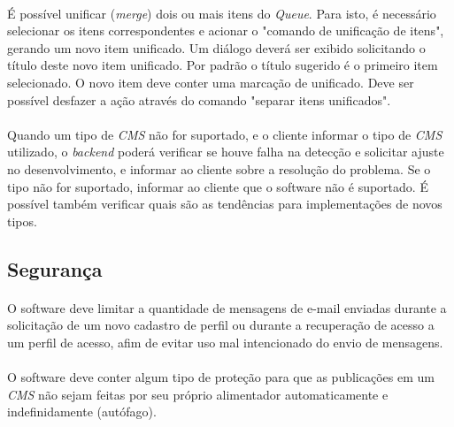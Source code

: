 \documentclass[a4paper,12pt]{article}
\def\cms{\emph{CMS}}
\def\queue{\emph{Queue}}
\begin{document}
\paragraph{}
É possível unificar (\emph{merge}) dois ou mais itens do \queue{}. Para isto, é
necessário selecionar os itens correspondentes e acionar o "comando de
unificação de itens", gerando um novo item unificado. Um diálogo deverá ser
exibido solicitando o título deste novo item unificado. Por padrão o título
sugerido é o primeiro item selecionado. O novo item deve conter uma marcação de
unificado. Deve ser possível desfazer a ação através do comando "separar itens
unificados".

\paragraph{}
Quando um tipo de \cms{} não for suportado, e o cliente informar o tipo de
\cms{} utilizado, o \emph{backend} poderá verificar se houve falha na detecção
e solicitar ajuste no desenvolvimento, e informar ao cliente sobre a resolução
do problema. Se o tipo não for suportado, informar ao cliente que o software
não é suportado. É possível também verificar quais são as tendências para
implementações de novos tipos.

\subsection{Segurança}

\paragraph{}
O software deve limitar a quantidade de mensagens de e-mail enviadas durante a
solicitação de um novo cadastro de perfil ou durante a recuperação de acesso a
um perfil de acesso, afim de evitar uso mal intencionado do envio de mensagens.

\paragraph{}
O software deve conter algum tipo de proteção para que as publicações em um
\cms{} não sejam feitas por seu próprio alimentador automaticamente e
indefinidamente (autófago).
\end{document}
